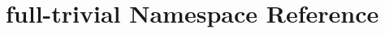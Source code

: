 \hypertarget{namespacefull-trivial}{\section{full-\/trivial Namespace Reference}
\label{namespacefull-trivial}
}
